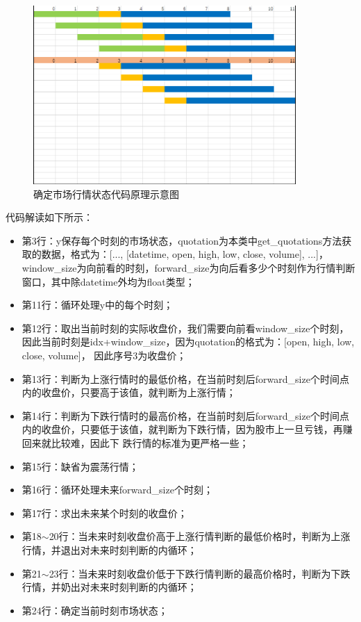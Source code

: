 \begin{figure}[H]
    \caption{确定市场行情状态代码原理示意图}
    \label{f000005}
    \centering
    \includegraphics[width=10cm]{images/f000005}
\end{figure}
代码解读如下所示：
\begin{itemize}
    \item 第3行：y保存每个时刻的市场状态，quotation为本类中get\_quotations方法获取的数据，格式为：[..., [datetime, open, high, low, close, volume], ...]，
    window\_size为向前看的时刻，forward\_size为向后看多少个时刻作为行情判断窗口，其中除datetime外均为float类型；
    \item 第11行：循环处理y中的每个时刻；
    \item 第12行：取出当前时刻的实际收盘价，我们需要向前看window\_size个时刻，因此当前时刻是idx+window\_size，因为quotation的格式为：[open, high, low, close, volume]，
    因此序号3为收盘价；
    \item 第13行：判断为上涨行情时的最低价格，在当前时刻后forward\_size个时间点内的收盘价，只要高于该值，就判断为上涨行情；
    \item 第14行：判断为下跌行情时的最高价格，在当前时刻后forward\_size个时间点内的收盘价，只要低于该值，就判断为下跌行情，因为股市上一旦亏钱，再赚回来就比较难，因此下
    跌行情的标准为更严格一些；
    \item 第15行：缺省为震荡行情；
    \item 第16行：循环处理未来forward\_size个时刻；
    \item 第17行：求出未来某个时刻的收盘价；
    \item 第18$\sim$20行：当未来时刻收盘价高于上涨行情判断的最低价格时，判断为上涨行情，并退出对未来时刻判断的内循环；
    \item 第21$\sim$23行：当未来时刻收盘价低于下跌行情判断的最高价格时，判断为下跌行情，并奶出对未来时刻判断的内循环；
    \item 第24行：确定当前时刻市场状态；
\end{itemize}

